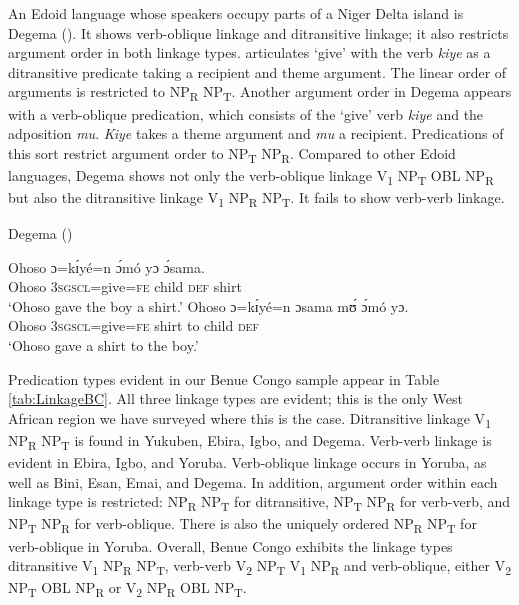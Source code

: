 \documentclass[output=paper,colorlinks,citecolor=brown]{langscibook}
\begin{document}
An Edoid language whose speakers occupy parts of a Niger Delta island is Degema (\cite{Kari2004}). It shows verb-oblique linkage and ditransitive linkage; it also restricts argument order in both linkage types.  articulates ‘give’ with the verb \textit{kiye} as a ditransitive predicate taking a recipient and theme argument. The linear order of arguments is restricted to NP\textsubscript{R} NP\textsubscript{T}. Another argument order in Degema appears with a verb-oblique predication, which consists of the ‘give’ verb \textit{kiye} and the adposition \textit{mu}. \textit{Kiye} takes a theme argument and \textit{mu} a recipient. Predications of this sort restrict argument order to NP\textsubscript{T} NP\textsubscript{R}. Compared to other Edoid languages, Degema shows not only the verb-oblique linkage V\textsubscript{1} NP\textsubscript{T} OBL NP\textsubscript{R} but also the ditransitive linkage V\textsubscript{1} NP\textsubscript{R} NP\textsubscript{T}. It fails to show verb-verb linkage.

\ea \label{ex:BC10} Degema  (\cite[194]{Kari2004})
\begin{xlist}
\ex
\gll Ohoso			ɔ=kɪ́yé=n						ɔ́mó		yɔ		ɔ́sama.\\
						Ohoso		\textsc{3sgscl}=give=\textsc{fe}	child	\textsc{def}	shirt\\
\glt						‘Ohoso gave the boy a shirt.’
\ex
\gll Ohoso		ɔ=kɪ́yé=n						ɔsama	mʊ́	ɔ́mó			yɔ.	\\
						Ohoso	\textsc{3sgscl}=give=\textsc{fe}	shirt			to		child		\textsc{def}\\
\glt						‘Ohoso gave a shirt to the boy.’
\end{xlist}
\z

Predication types evident in our Benue Congo sample appear in Table \ref{tab:LinkageBC}. All three linkage types are evident; this is the only West African region we have surveyed where this is the case. Ditransitive linkage V\textsubscript{1} NP\textsubscript{R} NP\textsubscript{T} is found in Yukuben, Ebira, Igbo, and Degema. Verb-verb linkage is evident in Ebira, Igbo, and Yoruba. Verb-oblique linkage occurs in Yoruba, as well as Bini, Esan, Emai, and Degema. In addition, argument order within each linkage type is restricted: NP\textsubscript{R} NP\textsubscript{T} for ditransitive, NP\textsubscript{T} NP\textsubscript{R} for verb-verb, and NP\textsubscript{T} NP\textsubscript{R} for verb-oblique. There is also the uniquely ordered NP\textsubscript{R} NP\textsubscript{T} for verb-oblique in Yoruba. Overall, Benue Congo exhibits the linkage types ditransitive V\textsubscript{1} NP\textsubscript{R} NP\textsubscript{T}, verb-verb V\textsubscript{2} NP\textsubscript{T} V\textsubscript{1} NP\textsubscript{R} and verb-oblique, either V\textsubscript{2} NP\textsubscript{T} OBL NP\textsubscript{R} or V\textsubscript{2} NP\textsubscript{R} OBL NP\textsubscript{T}.
\end{document}
